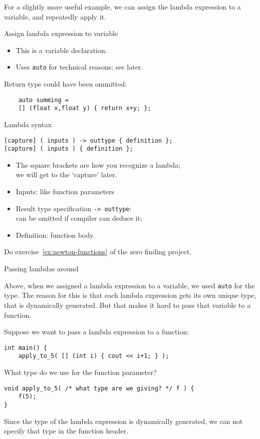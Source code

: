 For a slightly more useful example,
we can assign the lambda expression to a variable, and repeatedly apply it.

\begin{block}{Assign lambda expression to variable}
  \label{sl:lambdavar}
\begin{itemize}
\item This is a variable declaration.
\item Uses \lstinline+auto+ for technical reasons; see later.
\end{itemize}
Return type could have been ommitted:
\begin{lstlisting}
    auto summing = 
    [] (float x,float y) { return x+y; };
\end{lstlisting}
\end{block}

\begin{slide}{Lambda syntax}
  \label{sl:lambda-syntax}
\begin{lstlisting}
[capture] ( inputs ) -> outtype { definition };
[capture] ( inputs ) { definition };  
\end{lstlisting}
  \begin{itemize}
  \item The square brackets are how you recognize a lambda;\\
    we will get to the `capture' later.
  \item Inputs: like function parameters
  \item Result type specification \lstinline+-> outtype+:\\
    can be omitted if compiler can deduce it;
  \item Definition: function body.
  \end{itemize}
\end{slide}

\begin{exercise}
  Do exercise~\ref{ex:newton-functions} of the zero finding project.
\end{exercise}

 {Passing lambdas around}
\label{sec:lambdaauto}

Above, when we assigned a lambda expression to a variable,
we used \lstinline{auto} for the type.
The reason for this is that each lambda expression gets its own
unique type, that is dynamically generated.
But that makes it hard to pass that variable to a function.

Suppose we want to pass a lambda expression to a function:
\begin{lstlisting}
int main() {
    apply_to_5( [] (int i) { cout << i+1; } );
\end{lstlisting}
What type do we use for the function parameter?
\begin{lstlisting}
void apply_to_5( /* what type are we giving? */ f ) {
    f(5);
}
\end{lstlisting}
Since the type of the lambda expression is dynamically generated,
we can not specify that type in the function header.

